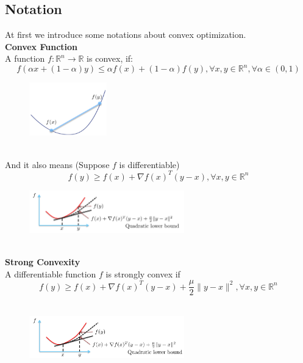 \documentclass[]{book}
\theoremstyle{definition}
\begin{document}
\subsection*{Notation}
At first we introduce some notations about convex optimization.\\
\textbf{Convex Function}\\
A function $f : \mathbb{R}^n \to \mathbb{R}$ is convex, if: $$f(\alpha x + (1-\alpha)y) \le \alpha f(x)+(1-\alpha)f(y),\forall x,y \in \mathbb{R}^n, \forall \alpha \in (0,1)$$
\begin{figure}[h]
\begin{center}
\includegraphics[width=0.3\textwidth]{convex} %

\end{center}
\end{figure}\\
And it also means (Suppose $f$ is differentiable) $$f(y)\ge f(x)+\nabla f(x)^T(y-x),\forall x,y\in\mathbb{R}^n$$
\begin{figure}[h]
\begin{center}
\includegraphics[width=0.6\textwidth]{convex1} %

\end{center}
\end{figure}\\
\textbf{Strong Convexity}\\
A differentiable function $f$ is strongly convex if\\
$$f(y)\ge f(x)+\nabla f(x)^T(y-x)+\frac{\mu}{2}\rVert y-x \rVert^2,\forall x,y\in\mathbb{R}^n$$\\
\begin{figure}[!htbp]
\begin{center}
\includegraphics[width=0.6\textwidth]{strong} %

\end{center}
\end{figure}\\
\end{document}

